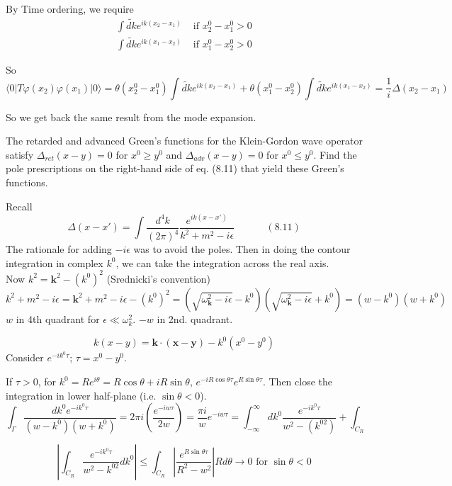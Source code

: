 \documentclass[twoside]{amsart}
\newcommand{\problemhead}[1]
  {\smallskip
   \noindent{\large\bf Problem #1.}
   }
\newcommand{\solutionhead}[1]
  {\smallskip
   \noindent{\large\bf Solution #1.}
   }
\begin{document}
By Time ordering, we require
\[
\begin{aligned} \int \widetilde{dk} e^{ik(x_2-x_1)} & \text{ if } x_2^0 - x_1^0 > 0 \\ 
  \int \widetilde{dk} e^{ik(x_1-x_2)} & \text{ if } x_1^0 - x_2^0 > 0  \end{aligned}  
\]

So
\[
  \langle 0 | T\varphi(x_2) \varphi(x_1) | 0 \rangle = \theta(x_2^0 - x_1^0) \int \widetilde{dk} e^{ik(x_2-x_1)} + \theta(x_1^0 - x_2^0) \int \widetilde{dk} e^{ik(x_1-x_2)} = \frac{1}{i} \Delta(x_2-x_1)
\]

So we get back the same result from the mode expansion.  

\problemhead{8.5} The retarded and advanced Green's functions for the Klein-Gordon wave operator satisfy $\Delta_{ret}(x-y) =0$ for $x^0 \geq y^0$ and $\Delta_{adv}(x-y) =0$ for $x^0 \leq y^0$.  Find the pole prescriptions on the right-hand side of eq. (8.11) that yield these Green's functions.  

\solutionhead{8.5} Recall
\[
\Delta(x-x') = \int \frac{d^4 k}{(2\pi)^4} \frac{e^{ik(x-x')} }{ k^2 + m^2 -i \epsilon } \quad \quad \quad \, (8.11)
\]
The rationale for adding $-i\epsilon$ was to avoid the poles.  Then in doing the contour integration in complex $k^0$, we can take the integration across the real axis.  \\

Now $k^2 = \mathbf{k}^2 - (k^0)^2$ (Srednicki's convention)
\[
k^2 + m^2 - i \epsilon = \mathbf{k}^2 + m^2 - i \epsilon - (k^0)^2 = (\sqrt{ \omega_{\mathbf{k}}^2 - i\epsilon } - k^0)( \sqrt{ \omega_{\mathbf{k}}^2 - i\epsilon } + k^0 ) = (w - k^0)(w+k^0)
\]
$w$ in 4th quadrant for $\epsilon \ll \omega_k^2$.  $-w$ in 2nd. quadrant.  

\[
k (x-y ) = \mathbf{k}\cdot (\mathbf{x} - \mathbf{y}) - k^0(x^0 - y^0)
\]
Consider $e^{-ik^0 \tau}$; $\tau = x^0 - y^0$.  

If $\tau >0$, for $k^0 = Re^{i\theta} = R\cos{\theta} + i R\sin{\theta}$, $e^{-iR \cos{\theta} \tau} e^{R\sin{\theta} \tau}$.  Then close the integration in lower half-plane (i.e. $\sin{\theta} <0$).  
\[
\int_{\Gamma} \frac{dk^0 e^{-ik^0 \tau} }{ (w- k^0)(w+k^0) } = 2\pi i \left( \frac{ e^{-i w \tau}}{2 w} \right) = \frac{ \pi i }{w} e^{-i w \tau } = \int_{-\infty}^{\infty} dk^0 \frac{e^{-ik^0 \tau}}{ w^2 - (k^{02}) } + \int_{C_R}
\]

\[
\left| \int_{C_R} \frac{e^{-i k^0 \tau}}{ w^2 - k^{02} } dk^0 \right| \leq \int_{C_R} \left| \frac{ e^{R\sin{\theta} \tau} }{ R^2 - w^2 } \right| R d\theta \to 0 \text{ for } \sin{\theta} < 0 
\]
\end{document}

